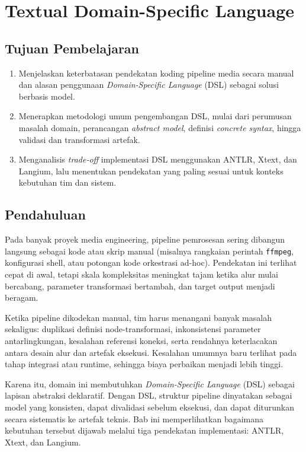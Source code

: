 \chapter{Textual Domain-Specific Language}
\label{chap:dsl-textual}

\section*{Tujuan Pembelajaran}
\begin{enumerate}
  \item Menjelaskan keterbatasan pendekatan koding pipeline media secara manual dan alasan penggunaan \textit{Domain-Specific Language} (DSL) sebagai solusi berbasis model.
  \item Menerapkan metodologi umum pengembangan DSL, mulai dari perumusan masalah domain, perancangan \textit{abstract model}, definisi \textit{concrete syntax}, hingga validasi dan transformasi artefak.
  \item Menganalisis \textit{trade-off} implementasi DSL menggunakan ANTLR, Xtext, dan Langium, lalu menentukan pendekatan yang paling sesuai untuk konteks kebutuhan tim dan sistem.
\end{enumerate}

\section{Pendahuluan}

Pada banyak proyek media engineering, pipeline pemrosesan sering dibangun langsung sebagai kode atau skrip manual (misalnya rangkaian perintah \texttt{ffmpeg}, konfigurasi shell, atau potongan kode orkestrasi ad-hoc). Pendekatan ini terlihat cepat di awal, tetapi skala kompleksitas meningkat tajam ketika alur mulai bercabang, parameter transformasi bertambah, dan target output menjadi beragam.

Ketika pipeline dikodekan manual, tim harus menangani banyak masalah sekaligus: duplikasi definisi node-transformasi, inkonsistensi parameter antarlingkungan, kesalahan referensi koneksi, serta rendahnya keterlacakan antara desain alur dan artefak eksekusi. Kesalahan umumnya baru terlihat pada tahap integrasi atau runtime, sehingga biaya perbaikan menjadi lebih tinggi.

Karena itu, domain ini membutuhkan \textit{Domain-Specific Language} (DSL) sebagai lapisan abstraksi deklaratif. Dengan DSL, struktur pipeline dinyatakan sebagai model yang konsisten, dapat divalidasi sebelum eksekusi, dan dapat diturunkan secara sistematis ke artefak teknis. Bab ini memperlihatkan bagaimana kebutuhan tersebut dijawab melalui tiga pendekatan implementasi: ANTLR, Xtext, dan Langium.

